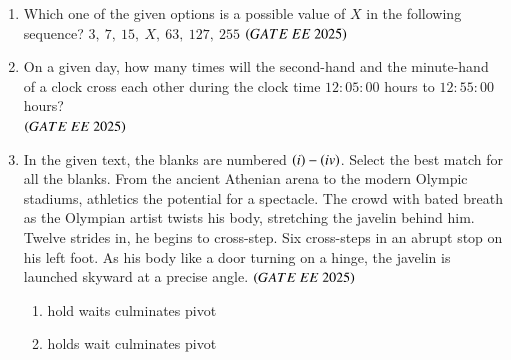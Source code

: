 \documentclass[journal,12pt,onecolumn]{IEEEtran}
\theoremstyle{remark}
\begin{document}
\begin{enumerate}
\begin{enumerate}
  \end{enumerate}
\item  Which one of the given options is a possible value of $ X $ in the following sequence?
$3,\ 7,\ 15,\ X,\ 63,\ 127,\ 255$
\hfill $\left(GATE\ EE\ 2025\right)$
    \begin{enumerate}
    \end{enumerate}
\item  On a given day, how many times will the second-hand and the minute-hand of a clock cross each other during the clock time $12:05:00$ hours to $12:55:00$ hours?\\
\hfill $\left(GATE\ EE\ 2025\right)$
    \begin{enumerate}
    \end{enumerate}
\item In the given text, the blanks are numbered $\left(i\right)- \left(iv\right)$. Select the best match for all the blanks. From the ancient Athenian arena to the modern Olympic stadiums, athletics \underline{} the potential for a spectacle. The crowd \underline{} with bated breath as the Olympian artist twists his body, stretching the javelin behind him. Twelve strides in, he begins to cross-step. Six cross-steps \underline{} in an abrupt stop on his left foot. As his body \underline{} like a door turning on a hinge, the javelin is launched skyward at a precise angle. 
\hfill $\left(GATE\ EE\ 2025\right)$
    \begin{enumerate}
  \item {} hold \quad {} waits \quad {} culminates \quad {} pivot  \item {} holds \quad {} wait \quad {} culminates \quad {} pivot 

\end{enumerate}
\end{enumerate}
\end{document}
